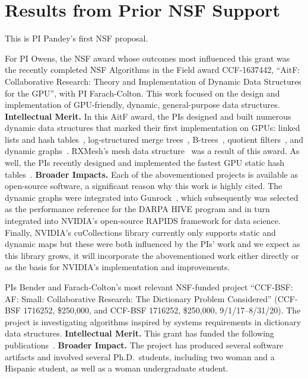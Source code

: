 \section{Results from Prior NSF Support}

This is PI Pandey's first NSF proposal.

For PI Owens, the NSF award whose outcomes most influenced this grant was the recently completed NSF Algorithms in the Field award CCF-1637442, ``AitF\@: Collaborative Research: Theory and Implementation of Dynamic Data Structures for the GPU'', with PI Farach-Colton. This work focused on the design and implementation of GPU-friendly, dynamic, general-purpose data structures.
\textbf{Intellectual Merit.} In this AitF award, the PIs designed and built numerous dynamic data structures that marked their first implementation on GPUs: linked lists and hash tables~\cite{Ashkiani:2018:ADH}, log-structured merge trees~\cite{Ashkiani:2018:GLA}, B-trees~\cite{Awad:2019:EAH}, quotient filters~\cite{Geil:2018:QFA}, and dynamic graphs~\cite{Awad:2020:DGO}. RXMesh's mesh data structure~\cite{Mahmoud:2021:RAG} was a result of this award. As well, the PIs recently designed and implemented the fastest GPU static hash tables~\cite{Awad:2023:AAI}.
%
\textbf{Broader Impacts.} Each of the abovementioned projects is available as open-source software, a significant reason why this work is highly cited. The dynamic graphs were integrated into Gunrock~\cite{Awad:2020:DGO,Wang:2017:GGG}, which subsequently was selected as the performance reference for the DARPA HIVE program and in turn integrated into NVIDIA's open-source RAPIDS framework for data science. Finally, NVIDIA's cuCollections library currently only supports static and dynamic maps but these were both influenced by the PIs' work and we expect as this library grows, it will incorporate the abovementioned work either directly or as the basis for NVIDIA's implementation and improvements.

PIs Bender and Farach-Colton's most relevant NSF-funded project ``CCF-BSF\@: AF\@: Small: Collaborative Research: The Dictionary Problem Considered''
(CCF-BSF 1716252, \$250,000, and CCF-BSF 1716252, \$250,000, 9/1/17--8/31/20).
The project is investigating algorithms inspired by systems requirements in dictionary data structures.
\textbf{Intellectual Merit.} This grant has funded the following
publications~\cite{AgrawalBeDa20,AgrawalBeFi20,%
ArkinDaGa20,Ashkiani:2018:ADH,Ashkiani:2018:GLA,BenderChDa20,BenderCoFa19,BenderDaJo20,BenderFaGo18,%
BenderFaKu19,BenderGoMe20,BenderKoKu20,ChenMcSi18,ConwayBaJi17b,ConwayFaSh18,ConwayKnJi19,%
DasAgBe20,DasTsDu19,BerceaEv20a,BerceaEv20b,%
ZhanCoJi18,ZhanJaPo18,ZhanJaPo18,Mayer18,Pandey19,PandeyABFJP18Cell,PandeyBJP17,%
PandeyBJP17a,PandeyBJP17b,Singh18,SinghMaBe20,%
JavanmardGaDa19DISC,%
GoswamiMeMe18,%
Geil:2018:QFA,pandey2020timely,%
EvenMeRa18,ConwayFaSh18,Awad:2019:EAH,BenderFiGi19,Farach-ColtonLiTs18,BenderKoPe18}.
%
\textbf{Broader Impact.} The project has produced several software artifacts and involved several Ph.D.\ students, including two woman and a Hispanic student, as well as a woman undergraduate student.
